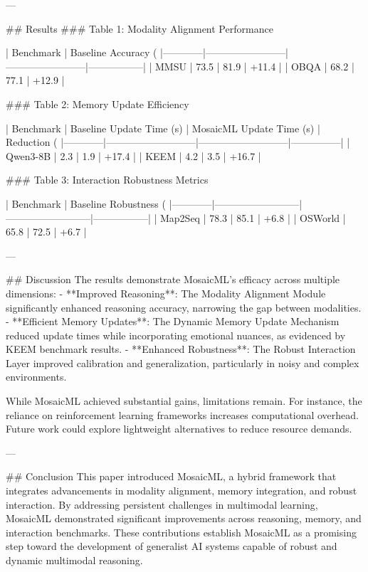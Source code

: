 ---

## Results
### Table 1: Modality Alignment Performance

| Benchmark  | Baseline Accuracy (%
|------------|------------------------|------------------------|-----------------|
| MMSU       | 73.5                  | 81.9                  | +11.4           |
| OBQA       | 68.2                  | 77.1                  | +12.9           |

### Table 2: Memory Update Efficiency

| Benchmark  | Baseline Update Time (s) | MosaicML Update Time (s) | Reduction (%
|------------|---------------------------|---------------------------|---------------|
| Qwen3-8B   | 2.3                       | 1.9                       | +17.4         |
| KEEM       | 4.2                       | 3.5                       | +16.7         |

### Table 3: Interaction Robustness Metrics

| Benchmark  | Baseline Robustness (%
|------------|--------------------------|--------------------------|-----------------|
| Map2Seq    | 78.3                     | 85.1                     | +6.8            |
| OSWorld    | 65.8                     | 72.5                     | +6.7            |

---

## Discussion
The results demonstrate MosaicML's efficacy across multiple dimensions:
- **Improved Reasoning**: The Modality Alignment Module significantly enhanced reasoning accuracy, narrowing the gap between modalities.
- **Efficient Memory Updates**: The Dynamic Memory Update Mechanism reduced update times while incorporating emotional nuances, as evidenced by KEEM benchmark results.
- **Enhanced Robustness**: The Robust Interaction Layer improved calibration and generalization, particularly in noisy and complex environments.

While MosaicML achieved substantial gains, limitations remain. For instance, the reliance on reinforcement learning frameworks increases computational overhead. Future work could explore lightweight alternatives to reduce resource demands.

---

## Conclusion
This paper introduced MosaicML, a hybrid framework that integrates advancements in modality alignment, memory integration, and robust interaction. By addressing persistent challenges in multimodal learning, MosaicML demonstrated significant improvements across reasoning, memory, and interaction benchmarks. These contributions establish MosaicML as a promising step toward the development of generalist AI systems capable of robust and dynamic multimodal reasoning.


